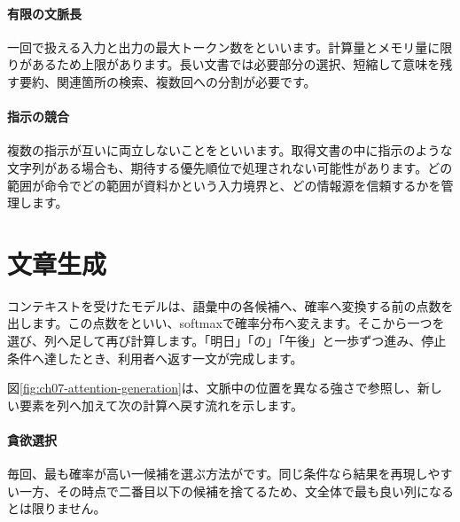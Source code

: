 \par
\endgroup
\medskip
\begingroup
\paragraph{有限の文脈長}
        一回で扱える入力と出力の最大トークン数をといいます。計算量とメモリ量に限りがあるため上限があります。長い文書では必要部分の選択、短縮して意味を残す要約、関連箇所の検索、複数回への分割が必要です。

\paragraph{指示の競合}
        複数の指示が互いに両立しないことをといいます。取得文書の中に指示のような文字列がある場合も、期待する優先順位で処理されない可能性があります。どの範囲が命令でどの範囲が資料かという入力境界と、どの情報源を信頼するかを管理します。

\par
\endgroup
\par
\endgroup


\section{文章生成}
\label{sec:06-machine-learning-30}

コンテキストを受けたモデルは、語彙中の各候補へ、確率へ変換する前の点数を出します。この点数をといい、softmaxで確率分布へ変えます。そこから一つを選び、列へ足して再び計算します。「明日」「の」「午後」と一歩ずつ進み、停止条件へ達したとき、利用者へ返す一文が完成します。

図\ref{fig:ch07-attention-generation}は、文脈中の位置を異なる強さで参照し、新しい要素を列へ加えて次の計算へ戻す流れを示します。

\begingroup
  \centering
  \vspace{5mm}
\begingroup
\paragraph{貪欲選択}
        毎回、最も確率が高い一候補を選ぶ方法がです。同じ条件なら結果を再現しやすい一方、その時点で二番目以下の候補を捨てるため、文全体で最も良い列になるとは限りません。

\par
\endgroup
\medskip
\begingroup
